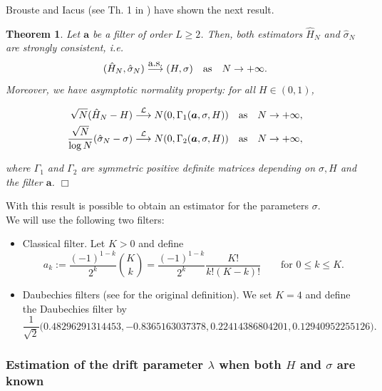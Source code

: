 \documentclass[12pt,reqno]{amsart}
\newtheorem{theorem}{Theorem}[section]
\theoremstyle{definition}
\theoremstyle{remark}
\numberwithin{equation}{section}
\begin{document}
Brouste and Iacus (see Th. 1 in \cite{br-ia}) have shown the next result.
\begin{theorem}
Let  $\bm{a}$ be a filter of order $L \ge 2$. Then, both estimators $\hat{H}_N$ and $\hat{\sigma}_N$  are
strongly consistent, i.e.
\[
( \hat{H}_N,\hat{\sigma}_N) \stackrel{\hbox{\rm a.s.}}{\longrightarrow} (H,\sigma) \quad \hbox{\rm as}\quad N \rightarrow+\infty.
\]
Moreover, we have asymptotic normality property:  for all $H \in (0, 1)$,

\begin{align*}
\sqrt{N} (\hat{H}_N  - H ) &\stackrel{\mathcal{L}}{\longrightarrow} N (0, \Gamma_1 ( \bm{a},\sigma,H)) \quad  \hbox{\rm as} \quad N
\rightarrow +\infty,\\
\frac{\sqrt{N}}{\log N} ( \hat{\sigma}_N  - \sigma ) &\stackrel{\mathcal{L}}{\longrightarrow} N (0, \Gamma_2 (\bm{a},\sigma,H)) \quad
\hbox{\rm as} \quad N \rightarrow +\infty,
\end{align*}

where $\Gamma_1$ and $\Gamma_2$ are symmetric positive definite matrices depending on $\sigma, H$ and the filter $\bm{a}$.
\hfill$\Box$
\end{theorem}

With this result is possible to obtain an estimator for the parameters $\sigma$.\\



We will use the following two filters:
\begin{itemize}
 \item Classical filter. Let $K>0$ and define
\begin{equation*}
  a_k:= \frac{(-1)^{1-k}}{2^k} {K\choose k} =\frac{(-1)^{1-k}}{2^k} \frac{K!}{k!(K-k)!}\qquad \mbox{for }  0\le k\le K.
\end{equation*}


\item Daubechies filters (see \cite{de} for the original definition). We set $K=4$ and define the Daubechies filter by
\begin{equation*}
 \frac{1}{\sqrt{2}} \big(0.48296291314453, -0.8365163037378, 0.22414386804201, 0.12940952255126\big).
\end{equation*}

\end{itemize}



\subsubsection{Estimation of the drift parameter $\lambda$ when both $H$ and $\sigma$ are known}
\end{document}
